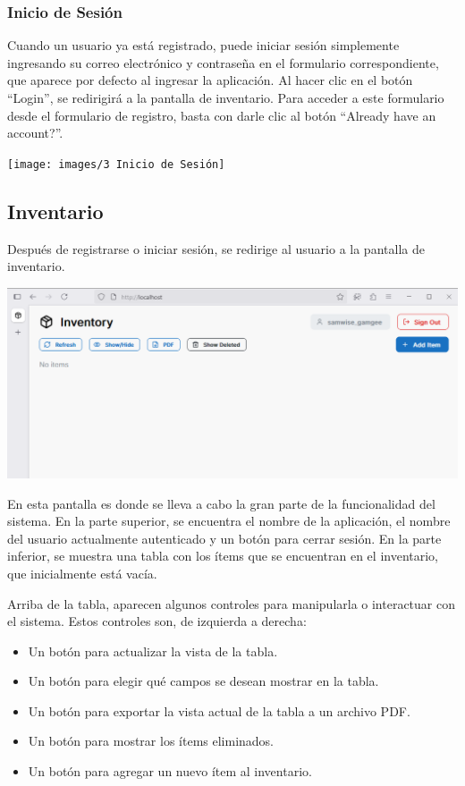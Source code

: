 \subsubsection{Inicio de Sesión}

Cuando un usuario ya está registrado, puede iniciar sesión simplemente ingresando su correo electrónico y contraseña en el formulario correspondiente, que aparece por defecto al ingresar la aplicación. Al hacer clic en el botón “Login”, se redirigirá a la pantalla de inventario. Para acceder a este formulario desde el formulario de registro, basta con darle clic al botón “Already have an account?”.

\texttt{[image: images/3 Inicio de Sesión]}

\subsection{Inventario}

Después de registrarse o iniciar sesión, se redirige al usuario a la pantalla de inventario.

\includegraphics[width=\textwidth]{images/4 Inventario}

En esta pantalla es donde se lleva a cabo la gran parte de la funcionalidad del sistema. En la parte superior, se encuentra el nombre de la aplicación, el nombre del usuario actualmente autenticado y un botón para cerrar sesión. En la parte inferior, se muestra una tabla con los ítems que se encuentran en el inventario, que inicialmente está vacía.

Arriba de la tabla, aparecen algunos controles para manipularla o interactuar con el sistema. Estos controles son, de izquierda a derecha:

\begin{itemize}
    \item Un botón para actualizar la vista de la tabla.
    \item Un botón para elegir qué campos se desean mostrar en la tabla.
    \item Un botón para exportar la vista actual de la tabla a un archivo PDF.
    \item Un botón para mostrar los ítems eliminados.
    \item Un botón para agregar un nuevo ítem al inventario.
\end{itemize}

